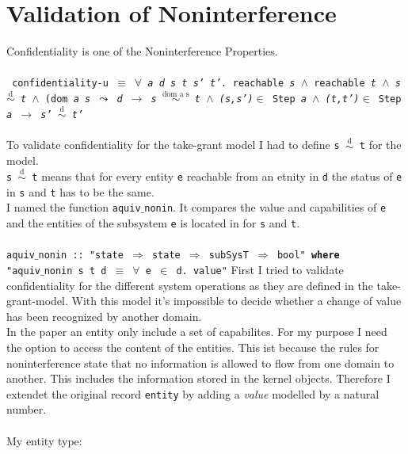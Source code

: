 \documentclass[pdftex,11pt,a4paper,twoside]{article}
\begin{document}
\section{Validation of Noninterference}\label{ValNon}
Confidentiality is one of the Noninterference Properties. \\ \\
\texttt{
confidentiality-u $\equiv$ $\forall$ \textit{a d s t s' t'.} reachable \textit{s} $\wedge$ reachable \textit{t} $\wedge$ \textit{s $\overset{\text{d}}{\sim}$ t} $\wedge$ (dom \textit{a s $\leadsto$ d $\longrightarrow$ s $\overset{\text{dom a s}}{\sim}$ t} $\wedge$ \textit{(s,s')}$\in$ Step \textit{a} $\wedge$ \textit{(t,t')}$\in$ Step \textit{a} $\longrightarrow$ \textit{s' $\overset{\text{d}}{\sim}$ t'}} \\ \\
To validate confidentiality for the take-grant model I had to define \texttt{s $\overset{\text{d}}{\sim}$ t} for the model. \\
\texttt{s $\overset{\text{d}}{\sim}$ t} means that for every entity \texttt{e} reachable from an etnity in \texttt{d} the status of \texttt{e} in \texttt{s} and \texttt{t} has to be the same. \\
I named the function \texttt{aquiv$\_$nonin}. It compares the value and capabilities of \texttt{e} and the entities of the subsystem \texttt{e} is located in for \texttt{s} and \texttt{t}. \\ \\
\texttt{aquiv$\_$nonin :: "state $\Rightarrow$ state $\Rightarrow$ subSysT $\Rightarrow$ bool" \textbf{where} \\
"aquiv$\_$nonin s t d $\equiv$ $\forall$ e $\in$ d. value"}  %
First I tried to validate confidentiality for the different system operations as they are defined in the take-grant-model. With this model it's impossible to decide whether a change of value has been recognized by another domain. \\
In the paper an entity only include a set of capabilites. For my purpose I need the option to access the content of the entities. This ist because the rules for noninterference state that no information is allowed to flow from one domain to another. This includes the information stored in the kernel objects. 
Therefore I extendet the original record \texttt{entity} by adding a \textit{value} modelled by a natural number. \\ \\
My entity type: \\ \\
\end{document}
